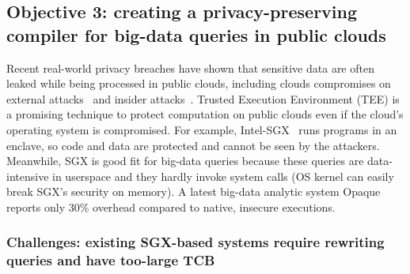 

\vspace{-.15in}\subsection{Objective 3: creating a privacy-preserving compiler 
for big-data queries in public clouds}\label{sec:obj3}\vspace{-.075in}


Recent real-world privacy breaches have shown that sensitive data are often 
leaked while being processed in public clouds, including clouds 
compromises on external attacks~\cite{icloud-breach} and 
insider attacks~\cite{top-threats}. Trusted Execution Environment 
(TEE) is a promising technique to protect computation on public clouds even if 
the cloud's operating system is compromised. For example, 
Intel-SGX~\cite{intel-sgx} runs programs in an enclave, so code and data are 
protected and cannot be seen by the attackers. Meanwhile, SGX is good fit for 
big-data queries because these queries are data-intensive in userspace and they 
hardly invoke system calls (OS kernel can easily break SGX's security on 
memory). A latest big-data analytic system Opaque~\cite{opaque:nsdi17} reports 
only 30\% overhead compared to native, insecure executions.

\vspace{-.15in}
\subsubsection{Challenges: existing SGX-based systems require rewriting 
queries and have too-large TCB} 
\label{sec:obj3-problem}\vspace{-.075in}

